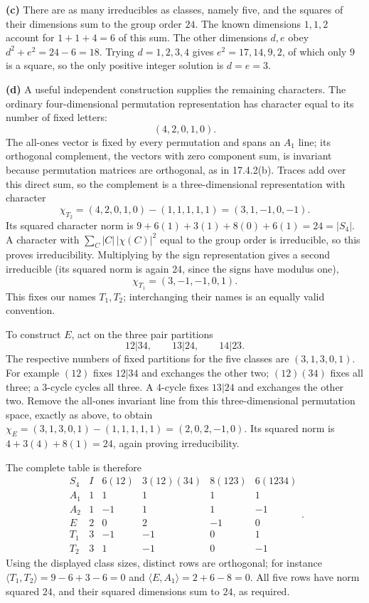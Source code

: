 \textbf{(c)} There are as many irreducibles as classes, namely five,
and the squares of their dimensions sum to the group order $24$.
The known dimensions $1,1,2$ account for $1+1+4=6$ of this sum.
The other dimensions $d,e$ obey
$d^2+e^2=24-6=18$. Trying $d=1,2,3,4$ gives $e^2=17,14,9,2$,
of which only $9$ is a square, so the only positive integer
solution is $d=e=3$.

\textbf{(d)} A useful independent construction supplies the
remaining characters. The ordinary four-dimensional permutation
representation has character equal to its number of fixed letters:
\[
(4,2,0,1,0).
\]
The all-ones vector is fixed by every permutation and spans an
$A_1$ line; its orthogonal complement, the vectors with zero
component sum, is invariant because permutation matrices are
orthogonal, as in 17.4.2(b). Traces add over this direct sum, so
the complement is a three-dimensional representation with character
\[
\chi_{T_2}=(4,2,0,1,0)-(1,1,1,1,1)=(3,1,-1,0,-1).
\]
Its squared character norm is
$9+6(1)+3(1)+8(0)+6(1)=24=|S_4|$. A character with
$\sum_C|C|\,|\chi(C)|^2$ equal to the group order is irreducible,
so this proves irreducibility.
Multiplying by the sign representation gives a second irreducible
(its squared norm is again $24$, since the signs have modulus one),
\[
\chi_{T_1}=(3,-1,-1,0,1).
\]
This fixes our names $T_1,T_2$; interchanging their names is
an equally valid convention.

To construct $E$, act on the three pair partitions
\[
12|34,\qquad13|24,\qquad14|23.
\]
The respective numbers of fixed partitions for the five classes
are $(3,1,3,0,1)$. For example $(12)$ fixes $12|34$ and
exchanges the other two; $(12)(34)$ fixes all three; a 3-cycle
cycles all three. A 4-cycle fixes $13|24$ and exchanges the other two.
Remove the all-ones invariant line from this three-dimensional
permutation space, exactly as above, to obtain
$\chi_E=(3,1,3,0,1)-(1,1,1,1,1)=(2,0,2,-1,0)$.
Its squared norm is $4+3(4)+8(1)=24$, again proving irreducibility.

The complete table is therefore
\[
\boxed{\begin{array}{c|rrrrr}
S_4&I&6(12)&3(12)(34)&8(123)&6(1234)\\\hline
A_1&1&1&1&1&1\\
A_2&1&-1&1&1&-1\\
E&2&0&2&-1&0\\
T_1&3&-1&-1&0&1\\
T_2&3&1&-1&0&-1
\end{array}}.
\]
Using the displayed class sizes, distinct rows are orthogonal;
for instance $\langle T_1,T_2\rangle=9-6+3-6=0$ and
$\langle E,A_1\rangle=2+6-8=0$.
All five rows have norm squared $24$, and their squared
dimensions sum to $24$, as required.

